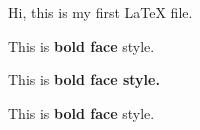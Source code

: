 \documentclass{article} %
\begin{document}

Hi, this is my first \LaTeX{} file.

This is \textbf{bold face} style. \par
This is \bfseries bold face style. \par 
This is {\bfseries bold face} style.
\end{document}
